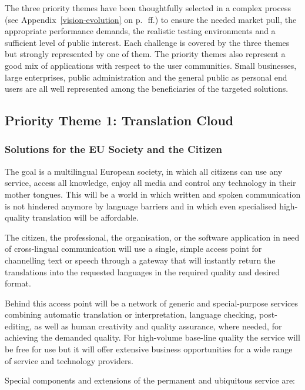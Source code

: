 \documentclass[10pt, plain]{../../metanetpaper}
\begin{document}
\begin{multicols}{2}
The three priority themes have been thoughtfully selected in a complex process (see Appendix~\ref{vision-evolution} on p.~\pageref{vision-evolution}\,ff.) to ensure the needed market pull, the appropriate performance demands, the realistic testing environments and a sufficient level of public interest. Each challenge is covered by the three themes but strongly represented by one of them. The priority themes also represent a good mix of applications with respect to the user communities. Small businesses, large enterprises, public administration and the general public as personal end users are all well represented among the beneficiaries of the targeted solutions.

\subsection{Priority Theme 1: Translation Cloud}
\label{sec:priority-theme-1-translation-cloud}

\subsubsection{Solutions for the EU Society and the Citizen}
\label{sec:solutions-eu-society-pt1}

The goal is a multilingual European society, in which all citizens can use any service, access all knowledge, enjoy all media and control any technology in their mother tongues. This will be a world in which written and spoken communication is not hindered anymore by language barriers and in which even specialised high-quality translation will be affordable.
 
The citizen, the professional, the organisation, or the software application in need of cross-lingual communication will use a single, simple access point for channelling text or speech through a gateway that will instantly return the translations into the requested languages in the required quality and desired format.
 
Behind this access point will be a network of generic and special-purpose services combining automatic translation or interpretation, language checking, post-editing, as well as human creativity and quality assurance, where needed, for achieving the demanded quality. For high-volume base-line quality the service will be free for use but it will offer extensive business opportunities for a wide range of service and technology providers.

Special components and extensions of the permanent and ubiquitous service are:


\end{multicols}
\end{document}
